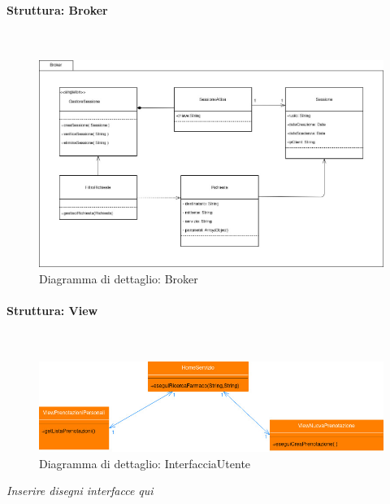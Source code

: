 \newpage

\paragraph{Struttura: Broker}\mbox{}\\

\begin{figure}[h!]
    \begin{center}
        \includegraphics[width=\textwidth]{immagini/Broker.jpg}
        \caption{Diagramma di dettaglio: Broker}
    \end{center}
\end{figure}

\newpage

\paragraph{Struttura: View}\mbox{}\\

\begin{figure}[h!]
    \begin{center}
        \includegraphics[width=\textwidth]{immagini/ViewCliente-progettazione.jpg}
        \caption{Diagramma di dettaglio: InterfacciaUtente}
    \end{center}
\end{figure}

\textit{Inserire disegni interfacce qui}

